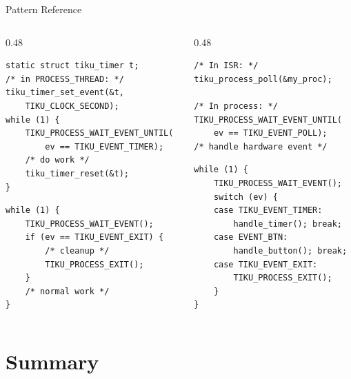 \documentclass[aspectratio=169, 10pt]{beamer}
\begin{document}
\begin{frame}[fragile]{Pattern Reference}
\begin{columns}[T]
\begin{column}{0.48\textwidth}
\begin{lstlisting}[style=cstyle, title={Periodic timer}]
static struct tiku_timer t;
/* in PROCESS_THREAD: */
tiku_timer_set_event(&t,
    TIKU_CLOCK_SECOND);
while (1) {
    TIKU_PROCESS_WAIT_EVENT_UNTIL(
        ev == TIKU_EVENT_TIMER);
    /* do work */
    tiku_timer_reset(&t);
}
\end{lstlisting}

\begin{lstlisting}[style=cstyle, title={Graceful shutdown}]
while (1) {
    TIKU_PROCESS_WAIT_EVENT();
    if (ev == TIKU_EVENT_EXIT) {
        /* cleanup */
        TIKU_PROCESS_EXIT();
    }
    /* normal work */
}
\end{lstlisting}
\end{column}

\begin{column}{0.48\textwidth}
\begin{lstlisting}[style=cstyle, title={ISR to process}]
/* In ISR: */
tiku_process_poll(&my_proc);

/* In process: */
TIKU_PROCESS_WAIT_EVENT_UNTIL(
    ev == TIKU_EVENT_POLL);
/* handle hardware event */
\end{lstlisting}

\begin{lstlisting}[style=cstyle, title={Multi-event dispatch}]
while (1) {
    TIKU_PROCESS_WAIT_EVENT();
    switch (ev) {
    case TIKU_EVENT_TIMER:
        handle_timer(); break;
    case EVENT_BTN:
        handle_button(); break;
    case TIKU_EVENT_EXIT:
        TIKU_PROCESS_EXIT();
    }
}
\end{lstlisting}
\end{column}
\end{columns}
\end{frame}

\section{Summary}
\end{document}
